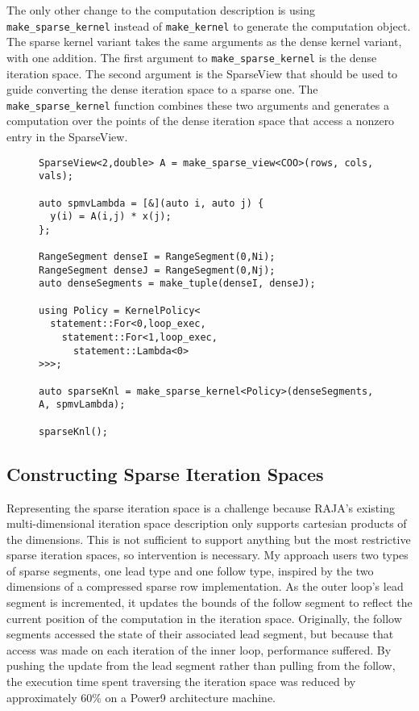 The only other change to the computation description is using \verb.make_sparse_kernel. instead of \verb.make_kernel. to generate the computation object.
The sparse kernel variant takes the same arguments as the dense kernel variant, with one addition.
The first argument to \verb.make_sparse_kernel. is the dense iteration space.
The second argument is the SparseView that should be used to guide converting the dense iteration space to a sparse one.
The \verb.make_sparse_kernel. function combines these two arguments and generates a computation over the points of the dense iteration space that access a nonzero entry in the SparseView.

\begin{figure}
\begin{lstlisting}[caption={SpMV kernel written using the SparseRAJA prototype interface.},label=SparseRAJASpMV]
SparseView<2,double> A = make_sparse_view<COO>(rows, cols, vals);

auto spmvLambda = [&](auto i, auto j) {
  y(i) = A(i,j) * x(j);
};

RangeSegment denseI = RangeSegment(0,Ni);
RangeSegment denseJ = RangeSegment(0,Nj);
auto denseSegments = make_tuple(denseI, denseJ);

using Policy = KernelPolicy<
  statement::For<0,loop_exec,
    statement::For<1,loop_exec,
      statement::Lambda<0>
>>>;

auto sparseKnl = make_sparse_kernel<Policy>(denseSegments, A, spmvLambda);

sparseKnl();
\end{lstlisting}
\end{figure}


\subsection{Constructing Sparse Iteration Spaces}\label{sec:SparseSegments}
Representing the sparse iteration space is a challenge because RAJA's existing multi-dimensional iteration space description only supports cartesian products of the dimensions.
This is not sufficient to support anything but the most restrictive sparse iteration spaces, so intervention is necessary.
My approach users two types of sparse segments, one lead type and one follow type, inspired by the two dimensions of a compressed sparse row implementation.
As the outer loop's lead segment is incremented, it updates the bounds of the follow segment to reflect the current position of the computation in the iteration space.
Originally, the follow segments accessed the state of their associated lead segment, but because that access was made on each iteration of the inner loop, performance suffered. 
By pushing the update from the lead segment rather than pulling from the follow, the execution time spent traversing the iteration space was reduced by approximately 60\% on a Power9 architecture machine.

